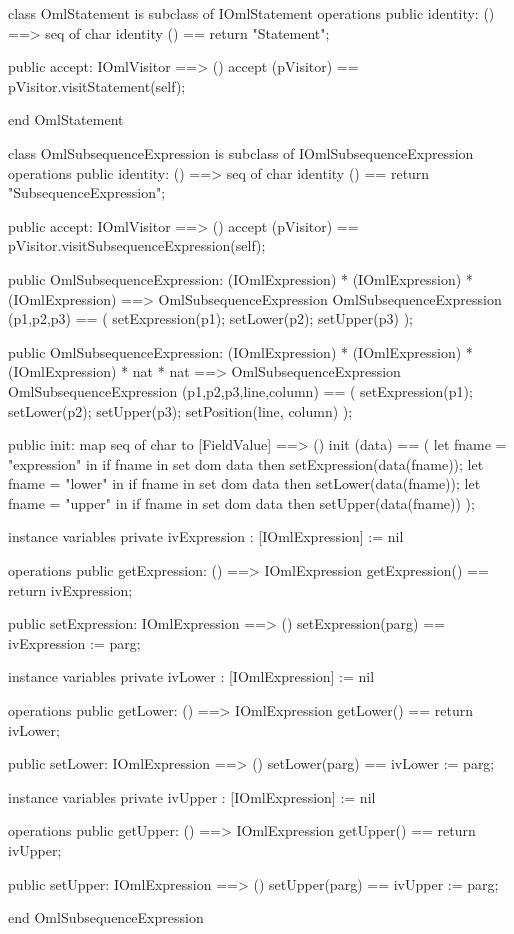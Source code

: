 \begin{vdm_al}
class OmlStatement is subclass of IOmlStatement
operations
  public identity: () ==> seq of char
  identity () == return "Statement";

  public accept: IOmlVisitor ==> ()
  accept (pVisitor) == pVisitor.visitStatement(self);

end OmlStatement
\end{vdm_al}
\begin{vdm_al}
class OmlSubsequenceExpression is subclass of IOmlSubsequenceExpression
operations
  public identity: () ==> seq of char
  identity () == return "SubsequenceExpression";

  public accept: IOmlVisitor ==> ()
  accept (pVisitor) == pVisitor.visitSubsequenceExpression(self);

  public OmlSubsequenceExpression:
    (IOmlExpression) *
    (IOmlExpression) *
    (IOmlExpression) ==> OmlSubsequenceExpression
  OmlSubsequenceExpression (p1,p2,p3) == 
    ( setExpression(p1);
      setLower(p2);
      setUpper(p3) );

  public OmlSubsequenceExpression:
    (IOmlExpression) *
    (IOmlExpression) *
    (IOmlExpression) *
    nat *
    nat ==> OmlSubsequenceExpression
  OmlSubsequenceExpression (p1,p2,p3,line,column) == 
    ( setExpression(p1);
      setLower(p2);
      setUpper(p3);
      setPosition(line, column) );

  public init: map seq of char to [FieldValue] ==> ()
  init (data) ==
    ( let fname = "expression" in
        if fname in set dom data
        then setExpression(data(fname));
      let fname = "lower" in
        if fname in set dom data
        then setLower(data(fname));
      let fname = "upper" in
        if fname in set dom data
        then setUpper(data(fname)) );

instance variables
  private ivExpression : [IOmlExpression] := nil

operations
  public getExpression: () ==> IOmlExpression
  getExpression() == return ivExpression;

  public setExpression: IOmlExpression ==> ()
  setExpression(parg) == ivExpression := parg;

instance variables
  private ivLower : [IOmlExpression] := nil

operations
  public getLower: () ==> IOmlExpression
  getLower() == return ivLower;

  public setLower: IOmlExpression ==> ()
  setLower(parg) == ivLower := parg;

instance variables
  private ivUpper : [IOmlExpression] := nil

operations
  public getUpper: () ==> IOmlExpression
  getUpper() == return ivUpper;

  public setUpper: IOmlExpression ==> ()
  setUpper(parg) == ivUpper := parg;

end OmlSubsequenceExpression
\end{vdm_al}

